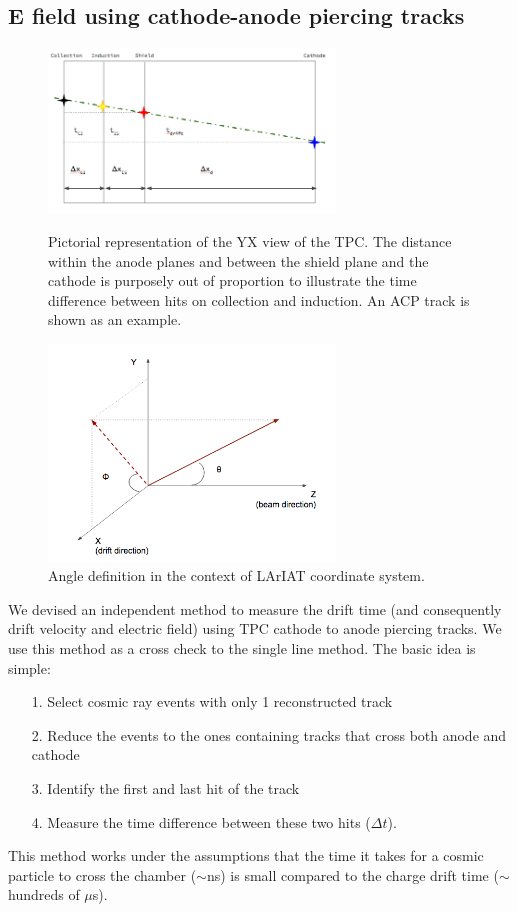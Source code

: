\subsection*{E field using cathode-anode piercing tracks}
\begin{figure}[b]
\centering
\begin{minipage}{0.45\textwidth}
\centering
\includegraphics[width=3in]{AppendixB-EField/Images/TPCCrossSectionView.png}
\caption{Pictorial representation of the YX view of the TPC. The distance within the anode planes and between the shield plane and the cathode is purposely out of proportion to illustrate the time difference between hits on collection and induction. An ACP track is shown as an example.}
\label{fig:Scheme}
\end{minipage}\hfill
\begin{minipage}{0.45\textwidth}
\centering
\includegraphics[width=3in]{AppendixB-EField/Images/AngleDef.png}
\caption{Angle definition in the context of LArIAT coordinate system.}
\label{fig:AngleDef}
\end{minipage}
\end{figure}
We devised an independent method to measure the drift time (and consequently drift velocity and electric field) using TPC cathode to anode piercing tracks. We use this method as a cross check to the single line method.
The basic idea is simple:
\begin{itemize}
\item[1.] Select cosmic ray events with only 1 reconstructed track 
\item[2.] Reduce the events to the ones containing tracks that cross both anode and cathode
\item[3.] Identify the first and last hit of the track
\item[4.] Measure the time difference between these two hits ($\Delta t$).
\end{itemize}
This method works under the assumptions that the time it takes for a cosmic particle to cross the chamber ($\sim$ns) is small compared to the charge drift time ($\sim$ hundreds of $\mu$s).

